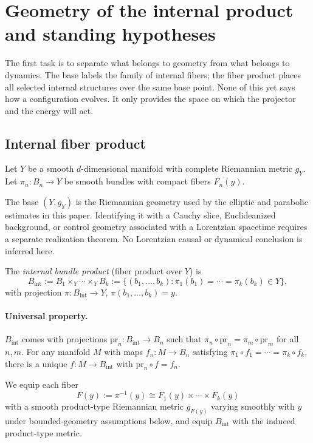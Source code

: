 \documentclass[11pt]{article}
\providecommand{\Bint}{B_{\mathrm{int}}}
\begin{document}
\section{Geometry of the internal product and standing hypotheses}

The first task is to separate what belongs to geometry from what belongs to
dynamics.  The base labels the family of internal fibers; the fiber product
places all selected internal structures over the same base point.  None of
this yet says how a configuration evolves.  It only provides the space on
which the projector and the energy will act.

\subsection{Internal fiber product}
Let $Y$ be a smooth $d$-dimensional manifold with complete Riemannian metric $g_Y$.
Let $\pi_n : B_n \to Y$ be smooth bundles with compact fibers $F_n(y)$.

\begin{remark}
The base $(Y,g_Y)$ is the Riemannian geometry used by the elliptic and parabolic
estimates in this paper. Identifying it with a Cauchy slice, Euclideanized
background, or control geometry associated with a Lorentzian spacetime requires
a separate realization theorem. No Lorentzian causal or dynamical conclusion
is inferred here.
\end{remark}

The \emph{internal bundle product} (fiber product over $Y$) is
\[
\Bint := B_1 \times_Y \cdots \times_Y B_k
:= \{(b_1,\dots,b_k): \pi_1(b_1)=\cdots=\pi_k(b_k)\in Y\},
\]
with projection $\pi:\Bint\to Y$, $\pi(b_1,\dots,b_k)=y$.

\paragraph{Universal property.}
$\Bint$ comes with projections $\mathrm{pr}_n:\Bint\to B_n$ such that $\pi_n\circ \mathrm{pr}_n=\pi_m\circ \mathrm{pr}_m$ for all $n,m$.
For any manifold $M$ with maps $f_n:M\to B_n$ satisfying $\pi_1\circ f_1=\cdots=\pi_k\circ f_k$,
there is a unique $f:M\to\Bint$ with $\mathrm{pr}_n\circ f=f_n$.

We equip each fiber
\[
F(y):=\pi^{-1}(y)\cong F_1(y)\times \cdots \times F_k(y)
\]
with a smooth product-type Riemannian metric $g_{F(y)}$ varying smoothly with $y$
under bounded-geometry assumptions below, and equip $\Bint$ with the induced product-type metric.
\end{document}
